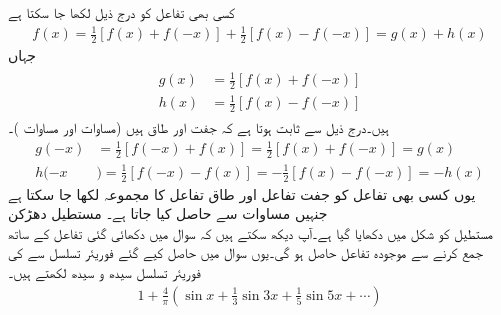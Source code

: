 کسی بھی تفاعل  کو درج ذیل لکھا جا سکتا ہے
\begin{align}
f(x)=\frac{1}{2}[f(x)+f(-x)]+\frac{1}{2}[f(x)-f(-x)]=g(x)+h(x)
\end{align}
جہاں
\begin{gather}
\begin{aligned}\label{مساوات_فوریئر_جفت_طاق_مجموعہ_کوئی_تفاعل}
g(x)&=\tfrac{1}{2}[f(x)+f(-x)]\\
h(x)&=\tfrac{1}{2}[f(x)-f(-x)]
\end{aligned}
\end{gather}
 ہیں۔درج ذیل سے  ثابت ہوتا ہے کہ  جفت اور  طاق ہیں (مساوات  اور مساوات )۔
\begin{align*}
g(-x)&=\frac{1}{2}[f(-x)+f(x)]=\frac{1}{2}[f(x)+f(-x)]=g(x)\\
h(-x&)=\frac{1}{2}[f(-x)-f(x)]=-\frac{1}{2}[f(x)-f(-x)]=-h(x)
\end{align*}
یوں کسی بھی تفاعل  کو جفت تفاعل  اور طاق تفاعل  کا مجموعہ لکھا جا سکتا ہے جنہیں مساوات  سے حاصل کیا جاتا ہے۔
\quad مستطیل دھڑکن\\
مستطیل   کو شکل  میں دکھایا گیا ہے۔آپ دیکھ سکتے ہیں کہ سوال   میں دکھائی گئی تفاعل  کے ساتھ  جمع کرنے سے موجودہ تفاعل  حاصل ہو گی۔یوں  سوال  میں حاصل کیے گئے فوریئر تسلسل سے  کی فوریئر تسلسل سیدھ و سیدھ لکھتے ہیں۔ 
\begin{align*}
1+\tfrac{4}{\pi}(\sin x+\tfrac{1}{3}\sin 3x+\tfrac{1}{5}\sin 5x+\cdots)
\end{align*}

